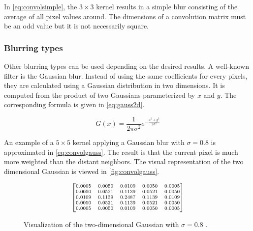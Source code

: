 In \eqref{eq:convolsimple}, the $3 \times 3$ kernel results in a simple blur consisting of the average of all pixel values around. The dimensions of a convolution matrix must be an odd value but it is not necessarily square.

\subsubsection{Blurring types}

Other blurring types can be used depending on the desired results. A well-known filter is the Gaussian blur. Instead of using the same coefficients for every pixels, they are calculated using a Gaussian distribution in two dimensions. It is computed from the product of two Gaussians parameterized by $x$ and $y$. The corresponding formula is given in \eqref{eq:gauss2d}.

\begin{equation}
\label{eq:gauss2d}
G(x) = \frac{1}{2\pi\sigma^2}e^{-\frac{x^2+y^2}{2\sigma^2}}
\end{equation}

An example of a $5 \times 5$ kernel applying a Gaussian blur with $\sigma = 0.8$ is approximated in \eqref{eq:convolgauss}. The result is that the current pixel is much more weighted than the distant neighbors. The visual representation of the two dimensional Gaussian is viewed in \autoref{fig:convolgauss}.

\begin{equation}
\label{eq:convolgauss}
{\scriptsize
\begin{bmatrix}
0.0005 & 0.0050 & 0.0109 & 0.0050 & 0.0005 \\
0.0050 & 0.0521 & 0.1139 & 0.0521 & 0.0050 \\
0.0109 & 0.1139 & 0.2487 & 0.1139 & 0.0109 \\
0.0050 & 0.0521 & 0.1139 & 0.0521 & 0.0050 \\
0.0005 & 0.0050 & 0.0109 & 0.0050 & 0.0005 \\
\end{bmatrix}
}
\end{equation}

\begin{figure}[!ht]
\centering
{}
\caption{Visualization of the two-dimensional Gaussian with $\sigma = 0.8 $ .}
\label{fig:convolgauss}
\end{figure}


